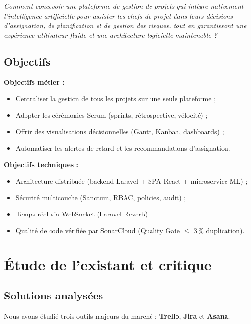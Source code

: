 \begin{mdframed}[linecolor=primary,linewidth=1.5pt,frametitle={}]
\centering
\textit{Comment concevoir une plateforme de gestion de projets qui intègre nativement
l'intelligence artificielle pour assister les chefs de projet dans leurs décisions
d'assignation, de planification et de gestion des risques, tout en garantissant une
expérience utilisateur fluide et une architecture logicielle maintenable ?}
\end{mdframed}

\subsection{Objectifs}

\textbf{Objectifs métier :}
\begin{itemize}
  \item Centraliser la gestion de tous les projets sur une seule plateforme ;
  \item Adopter les cérémonies Scrum (sprints, rétrospective, vélocité) ;
  \item Offrir des visualisations décisionnelles (Gantt, Kanban, dashboards) ;
  \item Automatiser les alertes de retard et les recommandations d'assignation.
\end{itemize}

\textbf{Objectifs techniques :}
\begin{itemize}
  \item Architecture distribuée (backend Laravel + SPA React + microservice ML) ;
  \item Sécurité multicouche (Sanctum, RBAC, policies, audit) ;
  \item Temps réel via WebSocket (Laravel Reverb) ;
  \item Qualité de code vérifiée par SonarCloud (Quality Gate \(\leq\) 3\,\% duplication).
\end{itemize}

\section{Étude de l'existant et critique}

\subsection{Solutions analysées}

Nous avons étudié trois outils majeurs du marché : \textbf{Trello}, \textbf{Jira}
et \textbf{Asana}.

